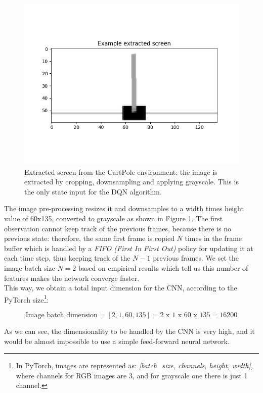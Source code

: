 \begin{figure}[h!]
	\label{fig:ExampleExtractScreen}
	\centering
	\includegraphics[width=12cm]{images/Example_extracted_screen.png}
	\caption{Extracted screen from the CartPole environment: the image is extracted by cropping, downsampling and applying grayscale. This is the only state input for the DQN algorithm.}
\end{figure}

\indent The image pre-processing resizes it and downsamples to a width times height value of 60x135, converted to grayscale as shown in Figure \ref{fig:ExampleExtractScreen}. The first observation cannot keep track of the previous frames, because there is no previous state: therefore, the same first frame is copied $N$ times in the frame buffer which is handled by a \textit{FIFO (First In First Out)} policy for updating it at each time step, thus keeping track of the $N-1$ previous frames. We set the image batch size $N=2$ based on empirical results which tell us this number of features makes the network converge faster.
\\
\indent This way, we obtain a total input dimension for the CNN, according to the PyTorch size\footnote{In PyTorch, images are represented as: \textit{[batch\_size, channels, height, width]}, where channels for RGB images are 3, and for grayscale one there is just 1 channel.}:

\begin{equation}
	\text{Image batch dimension} = [2, 1, 60, 135] = \text{2 x 1 x 60 x 135} = 16200
\end{equation}

As we can see, the dimensionality to be handled by the CNN is very high, and it would be almost impossible to use a simple feed-forward neural network.

